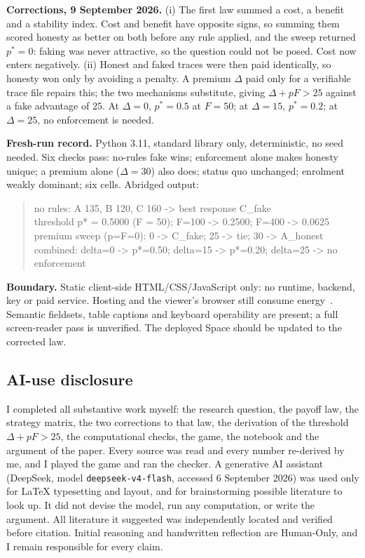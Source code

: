 \textbf{Corrections, 9 September 2026.} (i) The first law summed a cost, a benefit and a stability index. Cost and benefit have opposite signs, so summing them scored honesty as better on both before any rule applied, and the sweep returned $p^{*}=0$: faking was never attractive, so the question could not be posed. Cost now enters negatively. (ii) Honest and faked traces were then paid identically, so honesty won only by avoiding a penalty. A premium $\Delta$ paid only for a verifiable trace file repairs this; the two mechanisms substitute, giving $\Delta+pF>25$ against a fake advantage of $25$. At $\Delta=0$, $p^{*}=0.5$ at $F=50$; at $\Delta=15$, $p^{*}=0.2$; at $\Delta=25$, no enforcement is needed.

\textbf{Fresh-run record.} Python 3.11, standard library only, deterministic, no seed needed. Six checks pass: no-rules fake wins; enforcement alone makes honesty unique; a premium alone ($\Delta=30$) also does; status quo unchanged; enrolment weakly dominant; six cells. Abridged output:

\begin{quote}\small\ttfamily
no rules: A 135, B 120, C 160  ->  best response C\_fake\\
threshold p* = 0.5000 (F = 50);  F=100 -> 0.2500;  F=400 -> 0.0625\\
premium sweep (p=F=0): 0 -> C\_fake;  25 -> tie;  30 -> A\_honest\\
combined: delta=0 -> p*=0.50;  delta=15 -> p*=0.20;  delta=25 -> no enforcement
\end{quote}

\textbf{Boundary.} Static client-side HTML/CSS/JavaScript only: no runtime, backend, key or paid service. Hosting and the viewer's browser still consume energy~\cite{lannelongue2021}. Semantic fieldsets, table captions and keyboard operability are present; a full screen-reader pass is unverified. The deployed Space should be updated to the corrected law.

\subsection{AI-use disclosure}
I completed all substantive work myself: the research question, the payoff law, the strategy matrix, the two corrections to that law, the derivation of the threshold $\Delta+pF>25$, the computational checks, the game, the notebook and the argument of the paper. Every source was read and every number re-derived by me, and I played the game and ran the checker. A generative AI assistant (DeepSeek, model \texttt{deepseek-v4-flash}, accessed 6 September 2026) was used only for \LaTeX{} typesetting and layout, and for brainstorming possible literature to look up. It did not devise the model, run any computation, or write the argument. All literature it suggested was independently located and verified before citation. Initial reasoning and handwritten reflection are Human-Only, and I remain responsible for every claim.

